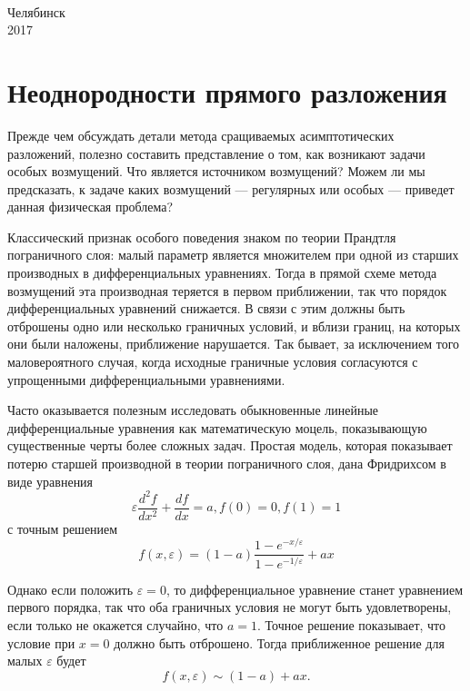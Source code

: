 \documentclass[12pt,a4paper,titlepage]{article}
\theoremstyle{definition}
\theoremstyle{remark}
\begin{document}
\begin{titlepage}
\begin{center}
{\begin{tabular}[t]{lllllllllllllllllll}
\end{tabular}
\\[1.5cm]}

\small{Челябинск}\\
\small{2017}
\end{center}
\end{titlepage}
\tableofcontents
\section{Неоднородности прямого разложения}

  Прежде чем обсуждать детали метода сращиваемых асимптотических разложений, полезно составить представление о том, как возникают задачи особых возмущений.
  Что является источником возмущений?
  Можем ли мы предсказать, к задаче каких возмущений — регулярных или особых — приведет данная физическая проблема?

  Классический признак особого поведения знаком по теории Прандтля пограничного слоя: малый параметр является множителем при одной из старших производных в дифференциальных уравнениях. 
  Тогда в прямой схеме метода возмущений эта производная теряется в первом приближении, так что порядок дифференциальных уравнений снижается.
  В связи с этим должны быть отброшены одно или несколько граничных условий, и вблизи границ, на которых они были наложены, приближение нарушается. 
  Так бывает, за исключением того маловероятного случая, когда исходные граничные условия согласуются с упрощенными дифференциальными уравнениями.
  
  Часто оказывается полезным исследовать обыкновенные линейные дифференциальные уравнения как математическую моцель, показывающую существенные черты более сложных задач. 
  Простая модель, которая показывает потерю старшей производной в теории пограничного слоя, дана Фридрихсом \cite{2} в виде уравнения
  \begin{equation} \label{eq:moddd}
    \varepsilon \frac{d^2f}{dx^2} + \frac{df}{dx} = a, f(0) = 0, f(1) = 1
  \end{equation}
  с точным решением
  $$
    f(x, \varepsilon) = (1-a) \frac{1-e^{-x/\varepsilon}}{1-e^{-1/\varepsilon}} + ax
  $$

  Однако если положить $\varepsilon = 0$, то дифференциальное уравнение станет уравнением
  первого порядка,
  так что оба граничных условия не могут быть удовлетворены,
  если только не окажется случайно, что $a=1$.
  Точное решение показывает,
  что условие при $x = 0$ должно быть отброшено.
  Тогда приближенное решение для малых $\varepsilon$ будет
  $$
    f(x, \varepsilon) \sim (1-a) + ax.
  $$
\end{document}
